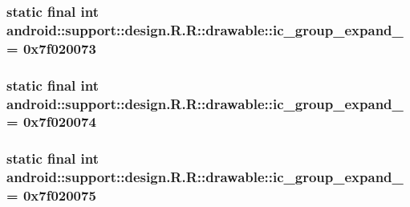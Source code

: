 \hypertarget{classandroid_1_1support_1_1design_1_1_r_1_1drawable_21ff6c1a30088bd7d182bc1210663c60}{
\subsubsection[{ic\_\-group\_\-expand\_\-04}]{\setlength{\rightskip}{0pt plus 5cm}static final int android::support::design.R.R::drawable::ic\_\-group\_\-expand\_ = 0x7f020073}}
\label{classandroid_1_1support_1_1design_1_1_r_1_1drawable_21ff6c1a30088bd7d182bc1210663c60}


\hypertarget{classandroid_1_1support_1_1design_1_1_r_1_1drawable_2901cdae9dc9877735f3070c5ee548e3}{
\subsubsection[{ic\_\-group\_\-expand\_\-05}]{\setlength{\rightskip}{0pt plus 5cm}static final int android::support::design.R.R::drawable::ic\_\-group\_\-expand\_ = 0x7f020074}}
\label{classandroid_1_1support_1_1design_1_1_r_1_1drawable_2901cdae9dc9877735f3070c5ee548e3}


\hypertarget{classandroid_1_1support_1_1design_1_1_r_1_1drawable_7057c59a37503122659fad31ca356edf}{
\subsubsection[{ic\_\-group\_\-expand\_\-06}]{\setlength{\rightskip}{0pt plus 5cm}static final int android::support::design.R.R::drawable::ic\_\-group\_\-expand\_ = 0x7f020075}}
\label{classandroid_1_1support_1_1design_1_1_r_1_1drawable_7057c59a37503122659fad31ca356edf}



